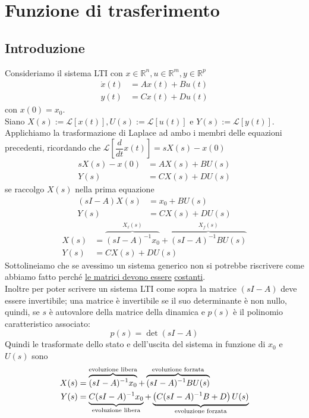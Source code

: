 \documentclass{article}
\numberwithin{equation}{subsection}
\let\oldsection\section%
\renewcommand{\section}{%
  \renewcommand{\theequation}{\thesection.\arabic{equation}}%
  \oldsection}%
\let\oldsubsection\subsection%
\renewcommand{\subsection}{%
  \renewcommand{\theequation}{\thesubsection.\arabic{equation}}%
  \oldsubsection}%
\begin{document}
\section{Funzione di trasferimento}
\subsection{Introduzione}
Consideriamo il sistema LTI con $x\in \mathbb{R}^n, u\in \mathbb{R}^m,y\in \mathbb{R}^p$
\begin{align*}
    \dot x(t) &= Ax(t) + Bu(t)\\
    y(t) &= Cx(t) + Du(t)
\end{align*}
con $x(0) = x_0$.
\vspace*{0.1cm}\\
Siano $X(s):= \mathcal{L}[x(t)], U(s):= \mathcal{L}[u(t)]$ e $Y(s):= \mathcal{L}[y(t)]$. Applichiamo la trasformazione di Laplace ad ambo i membri delle equazioni precedenti, ricordando che $\mathcal{L}\left[\dfrac{d}{dt}x(t)\right]=sX(s)-x(0)$
\begin{align*}
    sX(s) - x(0) &= AX(s) + BU(s)\\
    Y(s) &= CX(s) + DU(s) 
\end{align*}
se raccolgo $X(s)$ nella prima equazione
\begin{align*}
    (sI-A)X(s) &=x_0+ BU(s)\\
    Y(s) &= CX(s) + DU(s) 
\end{align*}
\begin{align*}
    X(s) &=\overbrace{(sI-A)^{-1}x_0}^{X_\ell (s)} +\overbrace{(sI-A)^{-1} BU(s)}^{X_f (s)}\\
    Y(s) &= CX(s) + DU(s) 
\end{align*}
Sottolineiamo che se avessimo un sistema generico non si potrebbe riscrivere come abbiamo fatto perché \underline{le matrici devono essere} \underline{costanti}.\\
Inoltre per poter scrivere un sistema LTI come sopra la matrice $(sI-A)$ deve essere invertibile; una matrice è invertibile se il suo determinante è non nullo, quindi, se $s$ è autovalore della matrice della dinamica e $p(s)$ è il polinomio caratteristico associato:
\begin{equation}
    p(s) = \det (sI-A)
\end{equation}
Quindi le trasformate dello stato e dell'uscita del sistema in funzione di $x_0$ e $U(s)$ sono 
\begin{align*}
    X(s) &=\overbrace{(sI-A)^{-1}x_0}^{\text{evoluzione libera}} +\overbrace{(sI-A)^{-1} BU(s)}^{\text{evoluzione forzata}}\\
    Y(s) &=\underbrace{C(sI-A)^{-1}x_0}_{\text{evoluzione libera}} + \underbrace{\left(C(sI-A)^{-1}B+D\right)U(s)}_{\text{evoluzione forzata}}
\end{align*}
\end{document}
